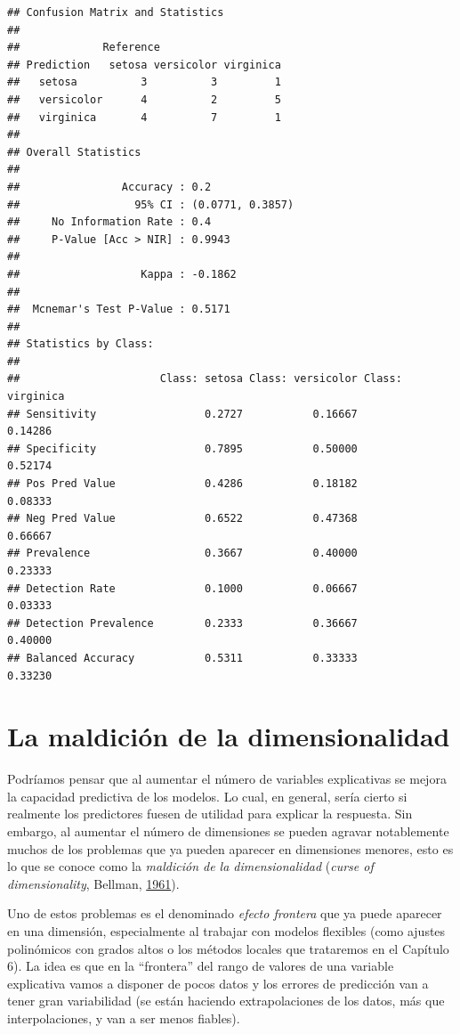 \documentclass[
  spanish,
]{book}
\theoremstyle{break}
\theoremstyle{definition}
\theoremstyle{definition}
\theoremstyle{definition}
\theoremstyle{remark}
\begin{document}
\begin{verbatim}
## Confusion Matrix and Statistics
## 
##             Reference
## Prediction   setosa versicolor virginica
##   setosa          3          3         1
##   versicolor      4          2         5
##   virginica       4          7         1
## 
## Overall Statistics
##                                           
##                Accuracy : 0.2             
##                  95% CI : (0.0771, 0.3857)
##     No Information Rate : 0.4             
##     P-Value [Acc > NIR] : 0.9943          
##                                           
##                   Kappa : -0.1862         
##                                           
##  Mcnemar's Test P-Value : 0.5171          
## 
## Statistics by Class:
## 
##                      Class: setosa Class: versicolor Class: virginica
## Sensitivity                 0.2727           0.16667          0.14286
## Specificity                 0.7895           0.50000          0.52174
## Pos Pred Value              0.4286           0.18182          0.08333
## Neg Pred Value              0.6522           0.47368          0.66667
## Prevalence                  0.3667           0.40000          0.23333
## Detection Rate              0.1000           0.06667          0.03333
## Detection Prevalence        0.2333           0.36667          0.40000
## Balanced Accuracy           0.5311           0.33333          0.33230
\end{verbatim}

\hypertarget{dimen-curse}{%
\section{La maldición de la dimensionalidad}\label{dimen-curse}}

Podríamos pensar que al aumentar el número de variables explicativas se mejora la capacidad predictiva de los modelos. Lo cual, en general, sería cierto si realmente los predictores fuesen de utilidad para explicar la respuesta.
Sin embargo, al aumentar el número de dimensiones se pueden agravar notablemente muchos de los problemas que ya pueden aparecer en dimensiones menores, esto es lo que se conoce como la \emph{maldición de la dimensionalidad} (\emph{curse of dimensionality}, Bellman, \protect\hyperlink{ref-bellman1961adaptive}{1961}).

Uno de estos problemas es el denominado \emph{efecto frontera} que ya puede aparecer en una dimensión, especialmente al trabajar con modelos flexibles (como ajustes polinómicos con grados altos o los métodos locales que trataremos en el Capítulo 6).
La idea es que en la ``frontera'' del rango de valores de una variable explicativa vamos a disponer de pocos datos y los errores de predicción van a tener gran variabilidad (se están haciendo extrapolaciones de los datos, más que interpolaciones, y van a ser menos fiables).
\end{document}
